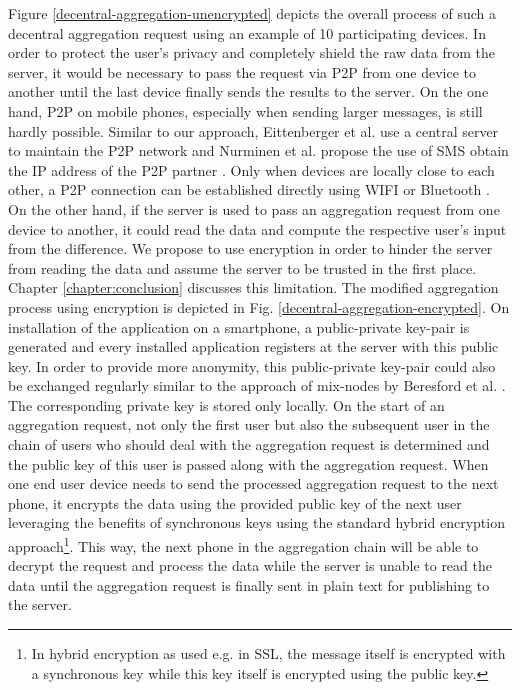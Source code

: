 Figure \ref{decentral-aggregation-unencrypted} depicts the overall process of such a decentral aggregation request using an example of 10 participating devices.
In order to protect the user's privacy and completely shield the raw data from the server, it would be necessary to pass the request via P2P from one device to another until the last device finally sends the results to the server. On the one hand, P2P on mobile phones, especially when sending larger messages, is still hardly possible. Similar to our approach, Eittenberger et al. \parencite{eittenberger2012rapidstream} use a central server to maintain the P2P network and Nurminen et al. propose the use of SMS obtain the IP address of the P2P partner \parencite{nurminen2006p2p}. Only when devices are locally close to each other, a P2P connection can be established directly using WIFI or Bluetooth \parencite{p2p-android}. On the other hand, if the server is used to pass an aggregation request from one device to another, it could read the data and compute the respective user's input from the difference. We propose to use encryption in order to hinder the server from reading the data and assume the server to be trusted in the first place. Chapter \ref{chapter:conclusion} discusses this limitation. The modified aggregation process using encryption is depicted in Fig. \ref{decentral-aggregation-encrypted}. On installation of the application on a smartphone, a public-private key-pair is generated and every installed application registers at the server with this public key. In order to provide more anonymity, this public-private key-pair could also be exchanged regularly similar to the approach of mix-nodes by Beresford et al. \parencite{mix-zones}. The corresponding private key is stored only locally. On the start of an aggregation request, not only the first user but also the subsequent user in the chain of users who should deal with the aggregation request is determined and the public key of this user is passed along with the aggregation request. When one end user device needs to send the processed aggregation request to the next phone, it encrypts the data using the provided public key of the next user leveraging the benefits of synchronous keys using the standard hybrid encryption approach\footnote{In hybrid encryption as used e.g. in SSL, the message itself is encrypted with a synchronous key while this key itself is encrypted using the public key.}. This way, the next phone in the aggregation chain will be able to decrypt the request and process the data while the server is unable to read the data until the aggregation request is finally sent in plain text for publishing to the server. 

